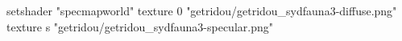 setshader "specmapworld"
texture 0 "getridou/getridou_sydfauna3-diffuse.png"
texture s "getridou/getridou_sydfauna3-specular.png"